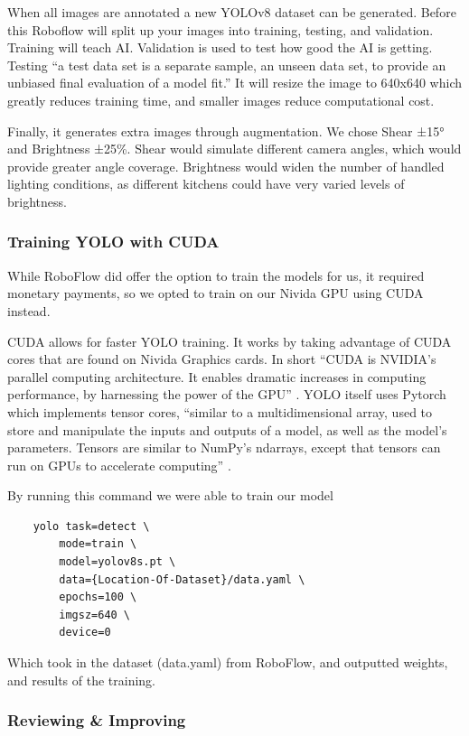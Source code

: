 \documentclass{article}
\begin{document}
When all images are annotated a new YOLOv8 dataset can be generated. Before this Roboflow will split up your images into training, testing, and validation. Training will teach AI. Validation is used to test how good the AI is getting. Testing “a test data set is a separate sample, an unseen data set, to provide an unbiased final evaluation of a model fit.” \cite{trainvalidtest} It will resize the image to 640x640 which greatly reduces training time, and smaller images reduce computational cost.

Finally, it generates extra images through augmentation. We chose Shear ±15° and Brightness ±25\%. Shear would simulate different camera angles, which would provide greater angle coverage. Brightness would widen the number of handled lighting conditions, as different kitchens could have very varied levels of brightness.

\subsubsection{Training YOLO with CUDA}
While RoboFlow did offer the option to train the models for us, it required monetary payments, so we opted to train on our Nivida GPU using CUDA \cite{cudacuda} instead.

CUDA allows for faster YOLO training. It works by taking advantage of CUDA cores that are found on Nivida Graphics cards. In short “CUDA is NVIDIA’s parallel computing architecture. It enables dramatic increases in computing performance, by harnessing the power of the GPU” \cite{ghorpade2012gpgpu}. YOLO itself uses Pytorch \cite{nvidiapytorch} which implements tensor cores, “similar to a multidimensional array, used to store and manipulate the inputs and outputs of a model, as well as the model’s parameters. Tensors are similar to NumPy’s ndarrays, except that tensors can run on GPUs to accelerate computing” \cite{nvidiapytorch}.

By running this command we were able to train our model
\begin{verbatim}
    yolo task=detect \
        mode=train \
        model=yolov8s.pt \
        data={Location-Of-Dataset}/data.yaml \
        epochs=100 \
        imgsz=640 \
        device=0
    \end{verbatim}


Which took in the dataset (data.yaml) from RoboFlow, and outputted weights, and results of the training.


\subsubsection{Reviewing \& Improving}
\end{document}
